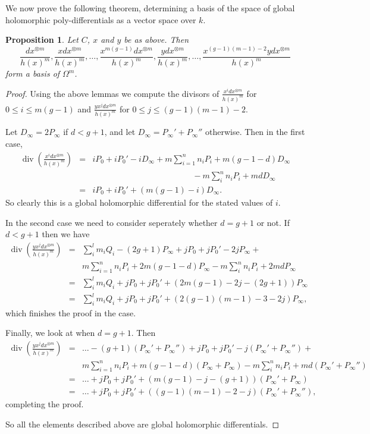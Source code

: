 \documentclass[11pt]{article} %
\newtheorem{prop}{Proposition}
\theoremstyle{remark}\newtheorem*{rem}{Remark}
\DeclareMathOperator{\di}{div}
\begin{document}
We now prove the following theorem, determining a basis of the space of global holomorphic poly-differentials as a vector space over $k$.\\

\begin{prop}
Let $C$, $x$ and $y$ be as above. 
Then
\[ \frac{dx^{\otimes m}}{h(x)^m}, \frac{xdx^{\otimes m}}{h(x)^m}, \ldots , \frac{x^{m(g-1)}dx^{\otimes m}}{h(x)^m}, 
\frac{ydx^{\otimes m}}{h(x)^m},\ldots , \frac{x^{(g-1)(m-1)-2}ydx^{\otimes m}}{h(x)^m}\]
form a basis of $\Omega^m$.
\end{prop}
\begin{proof}
 Using the above lemmas we compute the divisors of $\frac{x^idx^{\otimes m}}{h(x)^m}$ for $0\leq i \leq m(g-1)$ and $\frac{yx^jdx^{\otimes m}}{h(x)^m}$ for $0\leq j \leq (g-1)(m-1)-2$.
 
 Let $D_\infty=2 P_\infty$ if $d<g+1$, and let $D_\infty=P_\infty' + P_\infty''$ otherwise.
 Then in the first case, 
 \begin{eqnarray*}
  \di\left(\frac{x^idx^{\otimes m}}{h(x)^m}\right) & = &  iP_0+iP_0' - iD_{\infty} + m\sum_{i=1}^n n_iP_i + m(g-1-d)D_{\infty} \\
  & &  \quad \quad \quad\quad\quad\quad\quad\quad\quad\quad\quad\quad -m\sum_i^n n_i P_i +mdD_{\infty}\\
  & = & iP_0 + iP_0' + (m(g-1)-i)D_{\infty}.
 \end{eqnarray*}
 So clearly this is a global holomorphic differential for the stated values of $i$.
 
 In the second case we need to consider seperately whether $d=g+1$ or not.
 If $d<g+1$ then we have 
 \begin{eqnarray*}
  \di\left(\frac{yx^jdx^{\otimes m}}{h(x)^m}\right) & = &\sum_i^l m_iQ_i - (2g+1)P_\infty + jP_0+jP_0' - 2jP_\infty + \\
  & & m\sum_{i=1}^n n_i P_i + 2m(g-1-d)P_{\infty} -m\sum_i^n n_i P_i +2mdP_{\infty} \\
  & = & \sum_i^l m_iQ_i  + jP_0+jP_0' + (2m(g-1)-2j -(2g+1))P_{\infty} \\
  & = & \sum_i^l m_iQ_i  + jP_0+jP_0' + (2(g-1)(m-1)-3-2j)P_\infty,
  \end{eqnarray*}
  which finishes the proof in the case.
  
  Finally, we look at when $d=g+1$.
  Then
  \begin{eqnarray*}
     \di\left(\frac{yx^jdx^{\otimes m}}{h(x)^m}\right) & = & \ldots- (g+1)(P_\infty'+P_\infty'') + jP_0+jP_0' - j(P_\infty'+P_\infty'') + \\
  & & m\sum_{i=1}^n n_i P_i + m(g-1-d)(P_{\infty}+P_\infty) -m\sum_i^n n_i P_i + md(P_{\infty}'+P_\infty'') \\
  & = & \ldots + jP_0+jP_0' + (m(g-1)-j -(g+1))(P_{\infty}'+P_\infty) \\
  & = & \ldots  + jP_0+jP_0' + ((g-1)(m-1)-2-j)(P_\infty'+P_\infty''),
  \end{eqnarray*}
completing the proof.
 
  So all the elements described above are global holomorphic differentials.
\end{proof}




\end{document}
